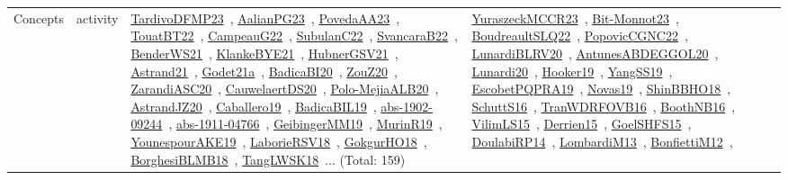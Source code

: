 {\begin{longtable}{lp{3cm}>{\raggedright\arraybackslash}p{6cm}>{\raggedright\arraybackslash}p{6cm}>{\raggedright\arraybackslash}p{8cm}}
Concepts & activity & \href{works/TardivoDFMP23.pdf}{TardivoDFMP23}~\cite{TardivoDFMP23}, \href{works/AalianPG23.pdf}{AalianPG23}~\cite{AalianPG23}, \href{works/PovedaAA23.pdf}{PovedaAA23}~\cite{PovedaAA23}, \href{works/TouatBT22.pdf}{TouatBT22}~\cite{TouatBT22}, \href{works/CampeauG22.pdf}{CampeauG22}~\cite{CampeauG22}, \href{works/SubulanC22.pdf}{SubulanC22}~\cite{SubulanC22}, \href{works/SvancaraB22.pdf}{SvancaraB22}~\cite{SvancaraB22}, \href{works/BenderWS21.pdf}{BenderWS21}~\cite{BenderWS21}, \href{works/KlankeBYE21.pdf}{KlankeBYE21}~\cite{KlankeBYE21}, \href{works/HubnerGSV21.pdf}{HubnerGSV21}~\cite{HubnerGSV21}, \href{works/Astrand21.pdf}{Astrand21}~\cite{Astrand21}, \href{works/Godet21a.pdf}{Godet21a}~\cite{Godet21a}, \href{works/BadicaBI20.pdf}{BadicaBI20}~\cite{BadicaBI20}, \href{works/ZouZ20.pdf}{ZouZ20}~\cite{ZouZ20}, \href{works/ZarandiASC20.pdf}{ZarandiASC20}~\cite{ZarandiASC20}, \href{works/CauwelaertDS20.pdf}{CauwelaertDS20}~\cite{CauwelaertDS20}, \href{works/Polo-MejiaALB20.pdf}{Polo-MejiaALB20}~\cite{Polo-MejiaALB20}, \href{works/AstrandJZ20.pdf}{AstrandJZ20}~\cite{AstrandJZ20}, \href{works/Caballero19.pdf}{Caballero19}~\cite{Caballero19}, \href{works/BadicaBIL19.pdf}{BadicaBIL19}~\cite{BadicaBIL19}, \href{works/abs-1902-09244.pdf}{abs-1902-09244}~\cite{abs-1902-09244}, \href{works/abs-1911-04766.pdf}{abs-1911-04766}~\cite{abs-1911-04766}, \href{works/GeibingerMM19.pdf}{GeibingerMM19}~\cite{GeibingerMM19}, \href{works/MurinR19.pdf}{MurinR19}~\cite{MurinR19}, \href{works/YounespourAKE19.pdf}{YounespourAKE19}~\cite{YounespourAKE19}, \href{works/LaborieRSV18.pdf}{LaborieRSV18}~\cite{LaborieRSV18}, \href{works/GokgurHO18.pdf}{GokgurHO18}~\cite{GokgurHO18}, \href{works/BorghesiBLMB18.pdf}{BorghesiBLMB18}~\cite{BorghesiBLMB18}, \href{works/TangLWSK18.pdf}{TangLWSK18}~\cite{TangLWSK18}... (Total: 159) & \href{works/YuraszeckMCCR23.pdf}{YuraszeckMCCR23}~\cite{YuraszeckMCCR23}, \href{works/Bit-Monnot23.pdf}{Bit-Monnot23}~\cite{Bit-Monnot23}, \href{works/BoudreaultSLQ22.pdf}{BoudreaultSLQ22}~\cite{BoudreaultSLQ22}, \href{works/PopovicCGNC22.pdf}{PopovicCGNC22}~\cite{PopovicCGNC22}, \href{works/LunardiBLRV20.pdf}{LunardiBLRV20}~\cite{LunardiBLRV20}, \href{works/AntunesABDEGGOL20.pdf}{AntunesABDEGGOL20}~\cite{AntunesABDEGGOL20}, \href{works/Lunardi20.pdf}{Lunardi20}~\cite{Lunardi20}, \href{works/Hooker19.pdf}{Hooker19}~\cite{Hooker19}, \href{works/YangSS19.pdf}{YangSS19}~\cite{YangSS19}, \href{works/EscobetPQPRA19.pdf}{EscobetPQPRA19}~\cite{EscobetPQPRA19}, \href{works/Novas19.pdf}{Novas19}~\cite{Novas19}, \href{works/ShinBBHO18.pdf}{ShinBBHO18}~\cite{ShinBBHO18}, \href{works/SchuttS16.pdf}{SchuttS16}~\cite{SchuttS16}, \href{works/TranWDRFOVB16.pdf}{TranWDRFOVB16}~\cite{TranWDRFOVB16}, \href{works/BoothNB16.pdf}{BoothNB16}~\cite{BoothNB16}, \href{works/VilimLS15.pdf}{VilimLS15}~\cite{VilimLS15}, \href{works/Derrien15.pdf}{Derrien15}~\cite{Derrien15}, \href{works/GoelSHFS15.pdf}{GoelSHFS15}~\cite{GoelSHFS15}, \href{works/DoulabiRP14.pdf}{DoulabiRP14}~\cite{DoulabiRP14}, \href{works/LombardiM13.pdf}{LombardiM13}~\cite{LombardiM13}, \href{works/BonfiettiM12.pdf}{BonfiettiM12}~\cite{BonfiettiM12}, 
\end{longtable}}
